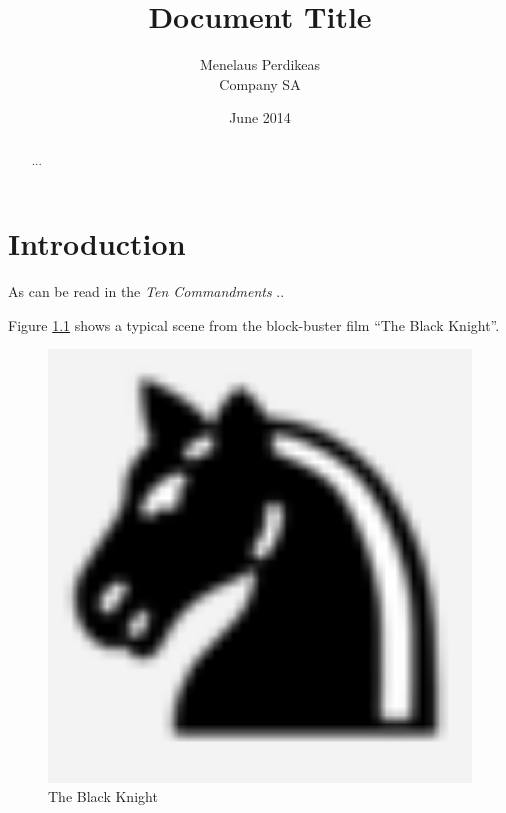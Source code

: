 \documentclass[11pt,twoside,a4paper,pagesize]{report}
\begin{document}
\title{\color{blue}Document Title}
\author{Menelaus Perdikeas\\ Company SA}
\date{June 2014}
\maketitle

\tableofcontents
\listoffigures
\lstlistoflistings

\renewcommand{\abstractname}{Executive Summary}
\begin{abstract}
...
\end{abstract}

\chapter{Introduction}
As can be read in the \textit{Ten Commandments} \cite{ref:ten-commandments} ..

Figure \ref{fig:black-knight} shows a typical scene from the block-buster
film ``The Black Knight''.

\begin{figure}[htbp]
    \centering
    \includegraphics[width=1.0\textwidth]{BlackKnight.png}
    \caption{The Black Knight}
    \label{fig:black-knight}
\end{figure}
\end{document}
